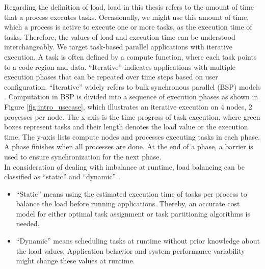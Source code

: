 Regarding the definition of load, load in this thesis refers to the amount of time that a process executes tasks. Occasionally, we might use this amount of time, which a process is active to execute one or more tasks, as the execution time of tasks. Therefore, the values of load and execution time can be understood interchangeably. We target task-based parallel applications with iterative execution. A task is often defined by a compute function, where each task points to a code region and data. ``Iterative'' indicates applications with multiple execution phases that can be repeated over time steps based on user configuration. ``Iterative'' widely refers to bulk synchronous parallel (BSP) models \cite{valiant1990bridging}. Computation in BSP is divided into a sequence of execution phases as shown in Figure \ref{fig:intro_usecase}, which illustrates an iterative execution on 4 nodes, 2 processes per node. The x-axis is the time progress of task execution, where green boxes represent tasks and their length denotes the load value or the execution time. The y-axis lists compute nodes and processes executing tasks in each phase. A phase finishes when all processes are done. At the end of a phase, a barrier is used to ensure synchronization for the next phase.\\

In consideration of dealing with imbalance at runtime, load balancing can be classified as ``static'' and ``dynamic'' \cite{xu1996load}.
\begin{itemize}
	\item ``Static'' means using the estimated execution time of tasks per process to balance the load before running applications. Thereby, an accurate cost model for either optimal task assignment or task partitioning algorithms is needed.
	\item ``Dynamic'' means scheduling tasks at runtime without prior knowledge about the load values. Application behavior and system performance variability might change these values at runtime.
\end{itemize}

